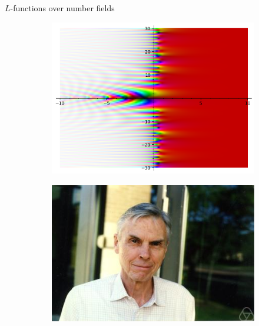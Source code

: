 \documentclass[10pt]{beamer}
\begin{document}
\begin{frame}{$L$-functions over number fields}
\begin{figure}[H]
\begin{subfigure}[b]{0.3\textwidth}
\includegraphics[width=\textwidth]{Hzeta-plot.png}
\end{subfigure}
  \begin{subfigure}[b]{0.3\textwidth}
  \centering
\includegraphics[width=.9\textwidth]{Tate.jpg}
\end{subfigure}
\end{figure}\vspace{-5pt}
\end{frame}
\end{document}
